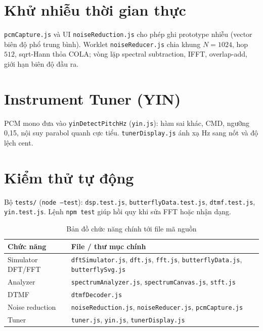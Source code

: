 \section{Khử nhiễu thời gian thực}
\texttt{pcmCapture.js} và UI \texttt{noiseReduction.js} cho phép ghi prototype nhiễu (vector biên độ phổ trung bình). Worklet \texttt{noiseReducer.js} chia khung $N=1024$, hop $512$, sqrt-Hann thỏa COLA; vòng lặp spectral subtraction, IFFT, overlap-add, giới hạn biên độ đầu ra.

\section{Instrument Tuner (YIN)}
PCM mono đưa vào \texttt{yinDetectPitchHz} (\texttt{yin.js}): hàm sai khác, CMD, ngưỡng 0{,}15, nội suy parabol quanh cực tiểu. \texttt{tunerDisplay.js} ánh xạ Hz sang nốt và độ lệch cent.

\section{Kiểm thử tự động}
Bộ \verb|tests/| (\texttt{node --test}): \texttt{dsp.test.js}, \texttt{butterflyData.test.js}, \texttt{dtmf.test.js}, \texttt{yin.test.js}. Lệnh \texttt{npm test} giúp hồi quy khi sửa FFT hoặc nhận dạng.

\begin{table}[htbp]
	\centering
	\caption{Bản đồ chức năng chính tới file mã nguồn}
	\label{tab:module-map}
	\begin{tabular}{@{}p{4.2cm}p{9cm}@{}}
		\toprule
		\textbf{Chức năng} & \textbf{File / thư mục chính} \\
		\midrule
		Simulator DFT/FFT & \texttt{dftSimulator.js}, \texttt{dft.js}, \texttt{fft.js}, \texttt{butterflyData.js}, \texttt{butterflySvg.js} \\
		Analyzer & \texttt{spectrumAnalyzer.js}, \texttt{spectrumCanvas.js}, \texttt{stft.js} \\
		DTMF & \texttt{dtmfDecoder.js} \\
		Noise reduction & \texttt{noiseReduction.js}, \texttt{noiseReducer.js}, \texttt{pcmCapture.js} \\
		Tuner & \texttt{tuner.js}, \texttt{yin.js}, \texttt{tunerDisplay.js} \\
		\bottomrule
	\end{tabular}
\end{table}
